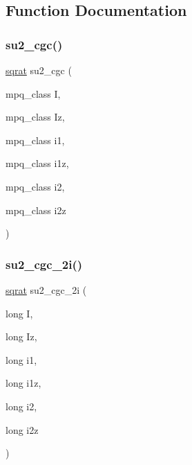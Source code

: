 \subsection{Function Documentation}
\mbox{\label{adat-devel_2lib_2SU3_2su2_8cc_a391f85ee5656866779d3efe09c992cc4}} 
\subsubsection{\texorpdfstring{su2\_cgc()}{su2\_cgc()}}
{\footnotesize\ttfamily \mbox{\hyperlink{classsqrat}{sqrat}} su2\+\_\+cgc (\begin{DoxyParamCaption}\item[{mpq\+\_\+class}]{I,  }\item[{mpq\+\_\+class}]{Iz,  }\item[{mpq\+\_\+class}]{i1,  }\item[{mpq\+\_\+class}]{i1z,  }\item[{mpq\+\_\+class}]{i2,  }\item[{mpq\+\_\+class}]{i2z }\end{DoxyParamCaption})}

\mbox{\label{adat-devel_2lib_2SU3_2su2_8cc_ae6ace82d1208ded7ef1fc847e1b6dc1b}} 
\subsubsection{\texorpdfstring{su2\_cgc\_2i()}{su2\_cgc\_2i()}}
{\footnotesize\ttfamily \mbox{\hyperlink{classsqrat}{sqrat}} su2\+\_\+cgc\+\_\+2i (\begin{DoxyParamCaption}\item[{long}]{I,  }\item[{long}]{Iz,  }\item[{long}]{i1,  }\item[{long}]{i1z,  }\item[{long}]{i2,  }\item[{long}]{i2z }\end{DoxyParamCaption})}

